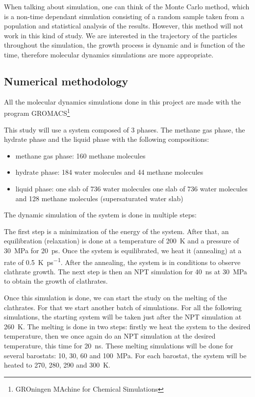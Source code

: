 When talking about simulation, one can think of the Monte Carlo method, which is a non-time dependant simulation consisting of a random sample taken from a population and statistical analysis of the results. However, this method will not work in this kind of study. We are interested in the trajectory of the particles throughout the simulation, the growth process is dynamic and is function of the time, therefore molecular dynamics simulations are more appropriate.

\subsection{Numerical methodology}
All the molecular dynamics simulations done in this project are made with the program GROMACS\footnote{GROningen MAchine for Chemical Simulations}

This study will use a system composed of 3 phases. The methane gas phase, the hydrate phase and the liquid phase with the following compositions:

\begin{itemize}
    \item methane gas phase: 160 methane molecules
    \item hydrate phase: 184 water molecules and 44 methane molecules
    \item liquid phase:
        \subitem one slab of 736 water molecules
        \subitem one slab of 736 water molecules and 128 methane molecules (supersaturated water slab)
\end{itemize}

The dynamic simulation of the system is done in multiple steps:

The first step is a minimization of the energy of the system. After that, an equilibration (relaxation) is done at a temperature of \SI{200}{\kelvin} and a pressure of \SI{30}{\mega\pascal} for \SI{20}{\pico\second}. Once the system is equilibrated, we heat it (annealing) at a rate of \SI{0.5}{\kelvin\per\pico\second}. After the annealing, the system is in conditions to observe clathrate growth. The next step is then an NPT simulation for \SI{40}{\nano\second} at \SI{30}{\mega\pascal} to obtain the growth of clathrates.

Once this simulation is done, we can start the study on the melting of the clathrates. For that we start another batch of simulations. For all the following simulations, the starting system will be taken just after the NPT simulation at \SI{260}{\kelvin}. The melting is done in two steps: firstly we heat the system to the desired temperature, then we once again do an NPT simulation at the desired temperature, this time for \SI{20}{\nano\second}. These melting simulations will be done for several barostats: 10, 30, 60 and \SI{100}{\mega\pascal}. For each barostat, the system will be heated to 270, 280, 290 and \SI{300}{\kelvin}.

